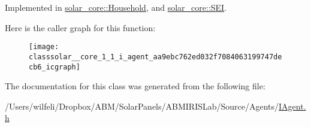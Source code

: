 Implemented in \hyperlink{classsolar__core_1_1_household_ac9d26af7b52f0cdc357fc5dca4b86ad9}{solar\+\_\+core\+::\+Household}, and \hyperlink{classsolar__core_1_1_s_e_i_aefbf747021fcb1f48742b0dd3bc7757f}{solar\+\_\+core\+::\+S\+E\+I}.



Here is the caller graph for this function\+:
\nopagebreak
\begin{figure}[H]
\begin{center}
\leavevmode
\texttt{[image: classsolar\_\_core\_1\_1\_i\_agent\_aa9ebc762ed032f7084063199747decb6\_icgraph]}
\end{center}
\end{figure}




The documentation for this class was generated from the following file\+:\begin{DoxyCompactItemize}
\item 
/\+Users/wilfeli/\+Dropbox/\+A\+B\+M/\+Solar\+Panels/\+A\+B\+M\+I\+R\+I\+S\+Lab/\+Source/\+Agents/\hyperlink{_i_agent_8h}{I\+Agent.\+h}\end{DoxyCompactItemize}
